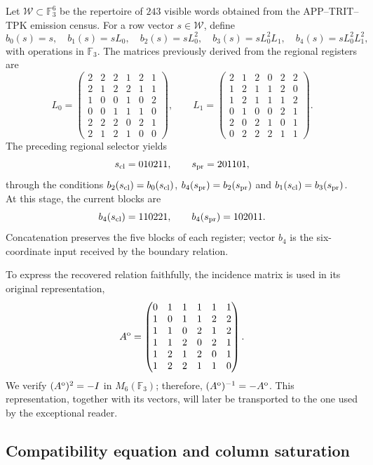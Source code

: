 Let $\mathcal W\subset\mathbb F_3^6$ be the repertoire of $243$ visible words obtained from the APP--TRIT--TPK emission census. For a row vector $s\in\mathcal W$, define
\[
 b_0(s)=s,\quad b_1(s)=sL_0,\quad b_2(s)=sL_0^2,\quad
 b_3(s)=sL_0^2L_1,\quad b_4(s)=sL_0^2L_1^2,
\]
with operations in $\mathbb F_3$. The matrices previously derived from the regional registers are
\[
L_0=\begin{pmatrix}
2&2&2&1&2&1\\2&1&2&2&1&1\\1&0&0&1&0&2\\
0&0&1&1&1&0\\2&2&2&0&2&1\\2&1&2&1&0&0
\end{pmatrix},\qquad
L_1=\begin{pmatrix}
2&1&2&0&2&2\\1&2&1&1&2&0\\1&2&1&1&1&2\\
0&1&0&0&2&1\\2&0&2&1&0&1\\0&2&2&2&1&1
\end{pmatrix}.
\]
The preceding regional selector yields
\[
s_{\rm cl}=010211,\qquad s_{\rm pr}=201101,
\]
through the conditions $b_2(s_{\rm cl})=b_0(s_{\rm cl})$, $b_4(s_{\rm pr})=b_2(s_{\rm pr})$ and $b_1(s_{\rm cl})=b_3(s_{\rm pr})$. At this stage, the current blocks are
\[
b_4(s_{\rm cl})=110221,\qquad
b_4(s_{\rm pr})=102011.
\]
Concatenation preserves the five blocks of each register; vector $b_4$ is the six-coordinate input received by the boundary relation.

To express the recovered relation faithfully, the incidence matrix is used in its original representation,
\begin{equation}
A^{\rm o}=\begin{pmatrix}
0&1&1&1&1&1\\1&0&1&1&2&2\\1&1&0&2&1&2\\
1&1&2&0&2&1\\1&2&1&2&0&1\\1&2&2&1&1&0
\end{pmatrix}.
\label{r36c:eq:ao}
\end{equation}
We verify $(A^{\rm o})^2=-I$ in $M_6(\mathbb F_3)$; therefore, $(A^{\rm o})^{-1}=-A^{\rm o}$. This representation, together with its vectors, will later be transported to the one used by the exceptional reader.

\subsection{Compatibility equation and column saturation}

